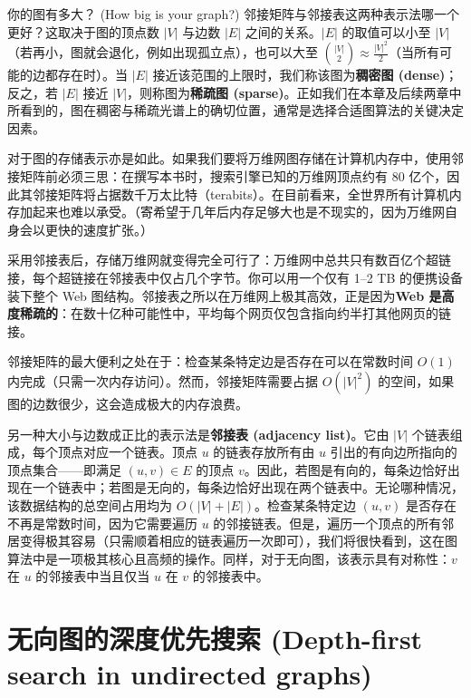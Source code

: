 \begin{sidebarbox}{你的图有多大？ (How big is your graph?)}
邻接矩阵与邻接表这两种表示法哪一个更好？这取决于图的顶点数 $|V|$ 与边数 $|E|$ 之间的关系。$|E|$ 的取值可以小至 $|V|$（若再小，图就会退化，例如出现孤立点），也可以大至 $\binom{|V|}{2} \approx \frac{|V|^2}{2}$（当所有可能的边都存在时）。当 $|E|$ 接近该范围的上限时，我们称该图为\textbf{稠密图 (dense)}；反之，若 $|E|$ 接近 $|V|$，则称图为\textbf{稀疏图 (sparse)}。正如我们在本章及后续两章中所看到的，图在稠密与稀疏光谱上的确切位置，通常是选择合适图算法的关键决定因素。

对于图的存储表示亦是如此。如果我们要将万维网图存储在计算机内存中，使用邻接矩阵前必须三思：在撰写本书时，搜索引擎已知的万维网顶点约有 80 亿个，因此其邻接矩阵将占据数千万太比特（terabits）。在目前看来，全世界所有计算机内存加起来也难以承受。（寄希望于几年后内存足够大也是不现实的，因为万维网自身会以更快的速度扩张。）

采用邻接表后，存储万维网就变得完全可行了：万维网中总共只有数百亿个超链接，每个超链接在邻接表中仅占几个字节。你可以用一个仅有 1--2 TB 的便携设备装下整个 Web 图结构。邻接表之所以在万维网上极其高效，正是因为\textbf{Web 是高度稀疏的}：在数十亿种可能性中，平均每个网页仅包含指向约半打其他网页的链接。
\end{sidebarbox}

邻接矩阵的最大便利之处在于：检查某条特定边是否存在可以在常数时间 $O(1)$ 内完成（只需一次内存访问）。然而，邻接矩阵需要占据 $O(|V|^2)$ 的空间，如果图的边数很少，这会造成极大的内存浪费。

另一种大小与边数成正比的表示法是\textbf{邻接表 (adjacency list)}。它由 $|V|$ 个链表组成，每个顶点对应一个链表。顶点 $u$ 的链表存放所有由 $u$ 引出的有向边所指向的顶点集合——即满足 $(u, v) \in E$ 的顶点 $v$。因此，若图是有向的，每条边恰好出现在一个链表中；若图是无向的，每条边恰好出现在两个链表中。无论哪种情况，该数据结构的总空间占用均为 $O(|V| + |E|)$。检查某条特定边 $(u, v)$ 是否存在不再是常数时间，因为它需要遍历 $u$ 的邻接链表。但是，遍历一个顶点的所有邻居变得极其容易（只需顺着相应的链表遍历一次即可），我们将很快看到，这在图算法中是一项极其核心且高频的操作。同样，对于无向图，该表示具有对称性：$v$ 在 $u$ 的邻接表中当且仅当 $u$ 在 $v$ 的邻接表中。

\section{无向图的深度优先搜索 (Depth-first search in undirected graphs)}

